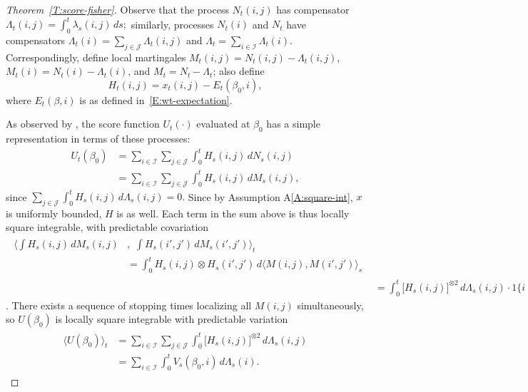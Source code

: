 \documentclass[final]{statsoc}
\begin{document}
\begin{proof}[Theorem~\ref{T:score-fisher}]
Observe that the process $N_t(i,j)$ has compensator
\(
    \Lambda_t(i,j)
        =
            \int_0^t \lambda_s(i,j) \, ds;
\)
similarly, processes $N_t(i)$ and $N_t$ have compensators
$\Lambda_t(i) = \sum_{j \in \mathcal{J}} \Lambda_t(i,j)$
and $\Lambda_t = \sum_{i \in \mathcal{I}} \Lambda_t(i)$.  Correspondingly,
define local martingales $M_t(i,j) = N_t(i,j) - \Lambda_t(i,j)$,
$M_t(i) = N_t(i) - \Lambda_t(i)$, and $M_t = N_t - \Lambda_t$;
also define
\[
    H_t(i,j)
        =
        x_t(i,j) - E_t(\beta_0,i),
\]
where $E_t(\beta,i)$ is as defined in~\eqref{E:wt-expectation}.

As observed by \citet{andersen1982cox}, the score function
$U_t(\cdot)$ evaluated at $\beta_0$ has
a simple representation in terms of these processes:
\begin{align*}
    U_t(\beta_0)
        &=
        \sum_{i \in \mathcal{I}}
        \sum_{j \in \mathcal{J}}
        \int_0^t
            H_s(i,j) \, dN_s(i,j) \\
        &=
        \sum_{i \in \mathcal{I}}
        \sum_{j \in \mathcal{J}}
        \int_0^t
            H_s(i,j) \, dM_s(i,j),
\end{align*}
since
\(
    \sum_{j \in \mathcal{J}}
    \int_0^t
        H_s(i,j) \,
        d\Lambda_s(i,j)
    =
    0.
\)
Since by Assumption A\ref{A:square-int}, $x$ is uniformly bounded, $H$
is as well.  Each term in the sum above is thus locally square integrable,
with predictable covariation
\begin{align*}
    \begin{split}
        \bigg\langle
            \int
                H_s(i,j) \, dM_s(i,j)
        &, \, \,
            \int
                H_s(i',j') \, dM_s(i',j')
        \bigg\rangle_t \\
        &=
            \int_0^t
                H_s(i,j) \otimes H_s(i',j') \,
                d\big\langle M(i,j), M(i',j')\big\rangle_s
    \end{split} \\
        &=
            \int_0^t
                \big[ H_s(i,j) \big]^{\otimes 2} \,
                d\Lambda_s(i,j)
            \cdot
            1\{ i = i', j = j' \}
\end{align*}
\citep[Thm.~2.4.3]{fleming1991counting}.  There exists a sequence
of stopping times localizing all $M(i,j)$ simultaneously, so $U(\beta_0)$ is
locally square integrable with predictable variation
\begin{align}
\begin{split}\label{E:score-compensator}
    \big\langle U(\beta_0) \big\rangle_t
        &=
            \sum_{i \in \mathcal{I}}
            \sum_{j \in \mathcal{J}}
            \int_0^t
                \big[ H_s(i,j) \big]^{\otimes 2} \,
                d\Lambda_s(i,j) \\
        &=
            \sum_{i \in \mathcal{I}}
            \int_0^t
                V_s(\beta_0, i) \,
                d\Lambda_s(i).
\end{split}
\end{align}


\end{proof}
\end{document}

